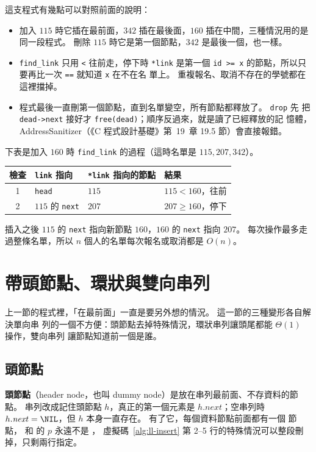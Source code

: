 這支程式有幾點可以對照前面的說明：

\begin{itemize}
\item 加入 $115$ 時它插在最前面，$342$ 插在最後面，$160$ 插在中間，三種情況用的是
同一段程式。 刪除 $115$ 時它是第一個節點，$342$ 是最後一個，也一樣。
\item \texttt{find\_link} 只用 \texttt{<} 往前走，停下時 \texttt{*link} 是第一個
\texttt{id >= x} 的節點，所以只要再比一次 \texttt{==} 就知道 \texttt{x} 在不在名
單上。 重複報名、取消不存在的學號都在這裡擋掉。
\item 程式最後一直刪第一個節點，直到名單變空，所有節點都釋放了。 \texttt{drop} 先
把 \texttt{dead->next} 接好才 \texttt{free(dead)}；順序反過來，就是讀了已經釋放的記
憶體，AddressSanitizer（《C 程式設計基礎》第~19~章 19.5 節）會直接報錯。
\end{itemize}

下表是加入 $160$ 時 \texttt{find\_link} 的過程（這時名單是 $115, 207, 342$）。

\begin{center}
\begin{tabular}{clll}
\toprule
檢查 & \texttt{link} 指向 & \texttt{*link} 指向的節點 & 結果 \\
\midrule
1 & \texttt{head} & $115$ & $115 < 160$，往前 \\
2 & $115$ 的 \texttt{next} & $207$ & $207 \ge 160$，停下 \\
\bottomrule
\end{tabular}
\end{center}

插入之後 $115$ 的 \texttt{next} 指向新節點 $160$，$160$ 的 \texttt{next} 指向
$207$。 每次操作最多走過整條名單，所以 $n$ 個人的名單每次報名或取消都是 $O(n)$。

\section{帶頭節點、環狀與雙向串列}
\label{sec:ll-variants}

上一節的程式裡，「在最前面」一直是要另外想的情況。 這一節的三種變形各自解決單向串
列的一個不方便：頭節點去掉特殊情況，環狀串列讓頭尾都能 $\Theta(1)$ 操作，雙向串列
讓節點知道前一個是誰。

\subsection{頭節點}

\textbf{頭節點}（header node，也叫 dummy node）是放在串列最前面、不存資料的節點。
串列改成記住頭節點 $h$，真正的第一個元素是 $h.\mathit{next}$；空串列時
$h.\mathit{next} = \NIL$，但 $h$ 本身一直存在。 有了它，每個資料節點前面都有一個
節點， 和  的 $p$ 永遠不是 \NIL，
虛擬碼~\ref{alg:ll-insert} 第 2--5 行的特殊情況可以整段刪掉，只剩兩行指定。

